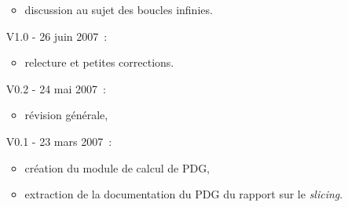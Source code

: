 \begin{small}
\begin{enumerate}
\begin{itemize}
      \item discussion au sujet des boucles infinies.
    \end{itemize}
  \item[V1.0 - ] 26 juin 2007~:
    \begin{itemize}
      \item relecture et petites corrections.
    \end{itemize}
  \item[V0.2 - ] 24 mai 2007~:
    \begin{itemize}
      \item révision générale,
    \end{itemize}
  \item[V0.1 - ] 23 mars 2007~:
    \begin{itemize}
      \item création du module de calcul de PDG,
      \item extraction de la documentation du PDG du rapport sur le {\it
	slicing}.
    \end{itemize}
\end{enumerate}
\end{small}
\cleardoublepage
\tableofcontents
\cleardoublepage
\cleardoublepage
\cleardoublepage
\cleardoublepage
\cleardoublepage
\cleardoublepage
\cleardoublepage
\appendix
\cleardoublepage 
\cleardoublepage


\cleardoublepage
\printindex
